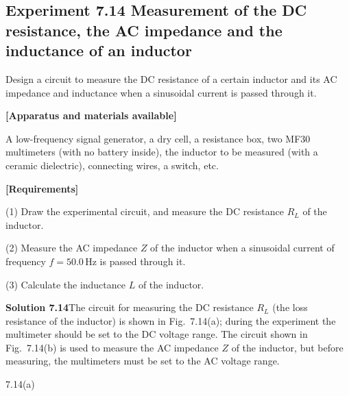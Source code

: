 \subsection*{Experiment 7.14 \quad Measurement of the DC resistance, the AC impedance and the inductance of an inductor}

Design a circuit to measure the DC resistance of a certain inductor and its AC impedance and inductance when a sinusoidal current is passed through it.

\textbf{[Apparatus and materials available]}

A low-frequency signal generator, a dry cell, a resistance box, two MF30 multimeters (with no battery inside), the inductor to be measured (with a ceramic dielectric), connecting wires, a switch, etc.

\textbf{[Requirements]}

(1) Draw the experimental circuit, and measure the DC resistance $R_L$ of the inductor.

(2) Measure the AC impedance $Z$ of the inductor when a sinusoidal current of frequency $f=50.0\,\mathrm{Hz}$ is passed through it.

(3) Calculate the inductance $L$ of the inductor.

\textbf{Solution 7.14}\quad The circuit for measuring the DC resistance $R_L$ (the loss resistance of the inductor) is shown in Fig.~7.14(a); during the experiment the multimeter should be set to the DC voltage range. The circuit shown in Fig.~7.14(b) is used to measure the AC impedance $Z$ of the inductor, but before measuring, the multimeters must be set to the AC voltage range.

\begin{figbox}{7.14(a)}
\end{figbox}

